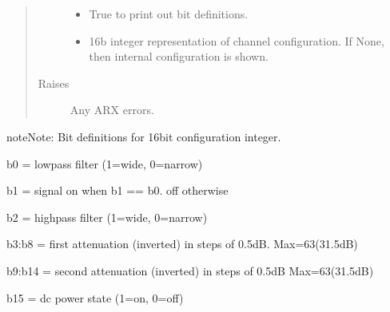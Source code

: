 \documentclass[letterpaper,10pt,english]{sphinxmanual}
\begin{document}
\begin{fulllineitems}
\begin{fulllineitems}
\begin{quote}
\begin{description}
\begin{itemize}
\item {} 
 \textendash{} True to print out bit definitions.

\item {} 
 \textendash{} 16b integer representation of channel configuration.
If None, then internal configuration is shown.

\end{itemize}

\item[{Raises}] \leavevmode
{} \textendash{} Any ARX errors.

\end{description}\end{quote}

\begin{sphinxadmonition}{note}{Note:}
Bit definitions for 16bit configuration integer.

b0 = lowpass filter (1=wide, 0=narrow)

b1 = signal on when b1 == b0. off otherwise

b2 = highpass filter (1=wide, 0=narrow)

b3:b8 = first attenuation (inverted) in steps of 0.5dB. Max=63(31.5dB)

b9:b14 = second attenuation (inverted) in steps of 0.5dB Max=63(31.5dB)

b15 = dc power state (1=on, 0=off)
\end{sphinxadmonition}




{\hyperref[\detokenize{index:lwautils.lwa_arx.ARX.get_chan_cfg}]{}}



\end{fulllineitems}


\end{fulllineitems}

\label{\detokenize{index:module-dsautils.dsa_store}}

\renewcommand{\indexname}{Python Module Index}
\begin{sphinxtheindex}
\let\bigletter\sphinxstyleindexlettergroup
\bigletter{d}
\item\relax{}
\indexspace
\bigletter{l}
\item\relax{}
\end{sphinxtheindex}

\renewcommand{\indexname}{Index}
\printindex
\end{document}
